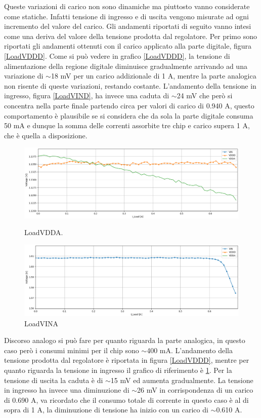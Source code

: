 Queste variazioni di carico non sono dinamiche ma piuttosto vanno considerate come statiche. Infatti tensione di ingresso e di uscita vengono misurate ad ogni incremento del valore del carico. 
Gli andamenti riportati di seguito vanno intesi come una deriva del valore della tensione prodotta dal regolatore. 
Per primo sono riportati gli andamenti ottenuti con il carico applicato alla parte digitale, figura \ref{LoadVDDD}. 
Come si può vedere in grafico \ref{LoadVDDD}, la tensione di alimentazione della regione digitale diminuisce gradualmente arrivando ad una variazione di $\sim$18 mV per un carico addizionale di 1 A, mentre la parte analogica non risente di queste variazioni, restando costante. 
L'andamento della tensione in ingresso, figura \ref{LoadVIND}, ha invece una caduta di $\sim$24 mV che però si concentra nella parte finale partendo circa per valori di carico di 0.940 A, questo comportamento è plausibile se si considera che da sola la parte digitale consuma 50 mA e dunque la somma delle correnti assorbite tre chip e carico supera 1 A, che è quella a disposizione. 
\begin{figure}
\centering
\includegraphics[width=\textwidth]{Immagini/LoadVDDA}
\caption{LoadVDDA.}
\label{LoadVDDA}
\includegraphics[width=\textwidth]{Immagini/LoadVINA}
\caption{LoadVINA}
\label{LoadVINA}
\end{figure}
Discorso analogo si può fare per quanto riguarda la parte analogica, in questo caso però i consumi minimi per il chip sono $\sim$400 mA. L'andamento della tensione prodotta dal regolatore è riportata in figura \ref{LoadVDDD}, mentre per quanto riguarda la tensione in ingresso il grafico di riferimento è \ref{LoadVINA}. 
Per la tensione di uscita la caduta è di $\sim$15 mV ed aumenta gradualmente. La tensione in ingresso ha invece una diminuzione di $\sim$26 mV in corrispondenza di un carico di 0.690 A, va ricordato che il consumo totale di corrente in questo caso è al di sopra di 1 A, la diminuzione di tensione ha inizio con un carico di $\sim$0.610 A.

